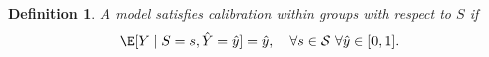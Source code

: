 \documentclass[11pt]{article} %
\newcommand{\indep}{\perp \!\!\! \perp}
\newtheorem{definition}[theorem]{Definition}
\begin{document}

\begin{definition}
\label{def:calibrationwithingroups}
    A model satisfies \emph{calibration within groups} with respect to $S$ if 
    \begin{equation}
        \E[Y \mid S=s, \hat{Y}=\hat{y}] = \hat{y}, \quad \forall s \in \mathcal{S} \thinspace \thinspace \forall \hat{y} \in [0,1].
    \end{equation}
\end{definition}
\end{document}
